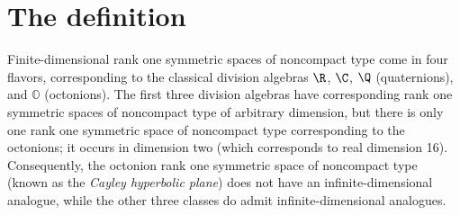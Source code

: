 %
%
%
%
%

\bigskip
\section{The definition}
\label{subsectionROSSONCT}

Finite-dimensional rank one symmetric spaces of noncompact type come in four flavors, corresponding to the classical division algebras $\R$, $\C$, $\Q$ (quaternions), and $\mathbb O$ (octonions). The first three division algebras have corresponding rank one symmetric spaces of noncompact type of arbitrary dimension, but there is only one rank one symmetric space of noncompact type corresponding to the octonions; it occurs in dimension two (which corresponds to real dimension 16). Consequently, the octonion rank one symmetric space of noncompact type (known as the \emph{Cayley hyperbolic plane}) does not have an infinite-dimensional analogue, while the other three classes do admit infinite-dimensional analogues.

